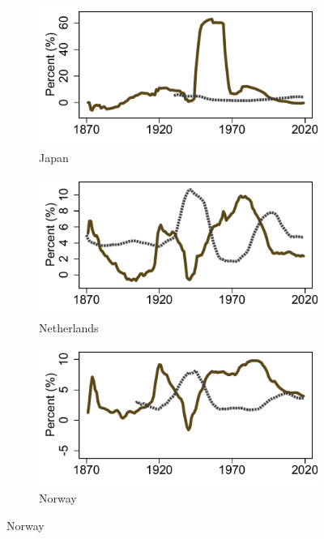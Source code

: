 \documentclass[12pt]{article}
\begin{document}
\begin{appendices}
\begin{singlespace}
\begin{figure}[ht]
\begin{subfigure}[b]{0.30\textwidth}
    \end{subfigure}
    \begin{subfigure}[b]{0.30\textwidth}
    \caption*{Japan}
    \includegraphics[width=\textwidth]{../Output/Figures/Median_dwn_unemp_Japan.pdf}   
    \end{subfigure}
    \begin{subfigure}[b]{0.30\textwidth}
    \caption*{Netherlands}
    \includegraphics[width=\textwidth]{../Output/Figures/Median_dwn_unemp_Netherlands.pdf}   
    \end{subfigure} 
    \begin{subfigure}[b]{0.30\textwidth}
    \caption*{Norway}
    \includegraphics[width=\textwidth]{../Output/Figures/Median_dwn_unemp_Norway.pdf}   

\end{subfigure}
\end{figure}
\end{singlespace}
\end{appendices}
\end{document}
